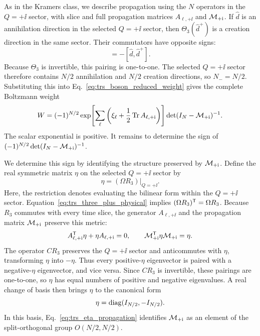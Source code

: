 As in the Kramers class, we describe propagation using the $N$ operators in the $Q=+\ii$ sector, with slice and full propagation matrices $A_{\ell,+\ii}$ and $\mathcal{M}_{+\mathrm{i}}$. If $\hat d$ is an annihilation direction in the selected $Q=+\ii$ sector, then $\Theta_3(\hat d^+)$ is a creation direction in the same sector. Their commutators have opposite signs:
\begin{equation}
    [\Theta_3(\hat d^+),(\Theta_3(\hat d^+))^+]=-[\hat d,\hat d^+].
\end{equation}
Because $\Theta_3$ is invertible, this pairing is one-to-one. The selected $Q=+\ii$ sector therefore contains $N/2$ annihilation and $N/2$ creation directions, so $N_-=N/2$. Substituting this into Eq.~\eqref{eq:trs_boson_reduced_weight} gives the complete Boltzmann weight
\begin{equation}
    W=(-1)^{N/2}
    \exp\!\left[\sum_\ell\left(\xi_\ell+\frac12\operatorname{Tr} A_{\ell,+\mathrm{i}}\right)\right]
    \det(I_N-\mathcal{M}_{+\mathrm{i}})^{-1}.
    \label{eq:trs_boson_three_plus_reduced_weight}
\end{equation}
The scalar exponential is positive. It remains to determine the sign of $(-1)^{N/2}\det(I_N-\mathcal{M}_{+\mathrm{i}})^{-1}$.

We determine this sign by identifying the structure preserved by $\mathcal{M}_{+\mathrm{i}}$. Define the real symmetric matrix $\eta$ on the selected $Q=+\ii$ sector by
\begin{equation}
    \eta=(\Omega R_3)\big|_{Q=+\ii}.
    \label{eq:trs_eta_definition}
\end{equation}
Here, the restriction denotes evaluating the bilinear form within the $Q=+\ii$ sector. Equation~\eqref{eq:trs_three_plus_physical} implies $(\Omega R_3)^{\mathsf{T}}=\Omega R_3$. Because $R_3$ commutes with every time slice, the generator $A_{\ell,+\ii}$ and the propagation matrix $\mathcal{M}_{+\mathrm{i}}$ preserve this metric:
\begin{equation}
    A_{\ell,+\mathrm{i}}^{\mathsf{T}}\eta+\eta A_{\ell,+\mathrm{i}}=0,\qquad
    \mathcal{M}_{+\mathrm{i}}^{\mathsf{T}}\eta\mathcal{M}_{+\mathrm{i}}=\eta.
    \label{eq:trs_eta_propagation}
\end{equation}
The operator $CR_3$ preserves the $Q=+\ii$ sector and anticommutes with $\eta$, transforming $\eta$ into $-\eta$. Thus every positive-$\eta$ eigenvector is paired with a negative-$\eta$ eigenvector, and vice versa. Since $CR_3$ is invertible, these pairings are one-to-one, so $\eta$ has equal numbers of positive and negative eigenvalues. A real change of basis then brings $\eta$ to the canonical form
\begin{equation}
    \eta=\operatorname{diag}(I_{N/2},-I_{N/2}).
\end{equation}
In this basis, Eq.~\eqref{eq:trs_eta_propagation} identifies $\mathcal{M}_{+\mathrm{i}}$ as an element of the split-orthogonal group $O(N/2,N/2)$.

